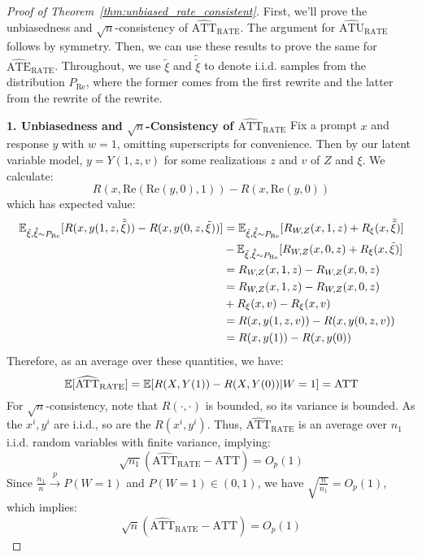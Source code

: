 \begin{proof}[Proof of Theorem~\ref{thm:unbiased_rate_consistent}]
    First, we'll prove the unbiasedness and $\sqrt{n}$-consistency of $\widehat{\text{ATT}}_{\text{RATE}}$. The argument for $\widehat{\text{ATU}}_{\text{RATE}}$ follows by symmetry. Then, we can use these results to prove the same for $\widehat{\text{ATE}}_{\text{RATE}}$. Throughout, we use $\tilde{\xi}$ and $\tilde{\tilde{\xi}}$ to denote i.i.d. samples from the distribution $P_{\text{Re}}$, where the former comes from the first rewrite and the latter from the rewrite of the rewrite.

    \textbf{1. Unbiasedness and $\sqrt{n}$-Consistency of $\widehat{\text{ATT}}_{\text{RATE}}$}
    Fix a prompt $x$ and response $y$ with $w = 1$, omitting superscripts for convenience. Then by our latent variable model, $y = Y(1, z, v)$ for some realizations $z$ and $v$ of $Z$ and $\xi$. We calculate:
    \[R(x, \text{Re}(\text{Re}(y, 0), 1)) - R(x, \text{Re}(y, 0))\]
    which has expected value:
    \begin{align*}
    \mathbb{E}_{\tilde{\xi}, \tilde{\tilde{\xi}} \sim P_{\text{Re}}}[R(x, y(1, z, \tilde{\tilde{\xi}})) - R(x, y(0, z, \tilde{\xi}))]
    &= \mathbb{E}_{\tilde{\xi}, \tilde{\tilde{\xi}} \sim P_{\text{Re}}}[R_{W,Z}(x, 1, z) + R_\xi(x, \tilde{\tilde{\xi}})] \\ &- \mathbb{E}_{\tilde{\xi}, \tilde{\tilde{\xi}} \sim P_{\text{Re}}}[R_{W,Z}(x, 0, z) + R_\xi(x, \tilde{\xi})] \\
    &= R_{W,Z}(x, 1, z) - R_{W,Z}(x, 0, z) \\
    &= R_{W,Z}(x, 1, z) - R_{W,Z}(x, 0, z) \\ &+ R_\xi(x, v) - R_\xi(x, v) \\
    &= R(x, y(1, z, v)) - R(x, y(0, z, v)) \\
    &= R(x, y(1)) - R(x, y(0))
    \end{align*}
    Therefore, as an average over these quantities, we have:
    \[\mathbb{E}[\widehat{\text{ATT}}_{\text{RATE}}] = \mathbb{E}[R(X, Y(1)) - R(X, Y(0)) | W = 1] = \text{ATT}\]
    For $\sqrt{n}$-consistency, note that $R(\cdot, \cdot)$ is bounded, so its variance is bounded. As the ${x^i, y^{i}}$ are i.i.d., so are the $R(x^i, y^{i})$. Thus, $\widehat{\text{ATT}}_{\text{RATE}}$ is an average over $n_1$ i.i.d. random variables with finite variance, implying:
    \[\sqrt{n_1}(\widehat{\text{ATT}}_{\text{RATE}} - \text{ATT}) = O_p(1)\]
    Since $\frac{n_1}{n} \xrightarrow{p} P(W=1)$ and $P(W=1) \in (0,1)$, we have $\sqrt{\frac{n}{n_1}} = O_p(1)$, which implies:
    \[\sqrt{n}(\widehat{\text{ATT}}_{\text{RATE}} - \text{ATT}) = O_p(1)\]


\end{proof}
